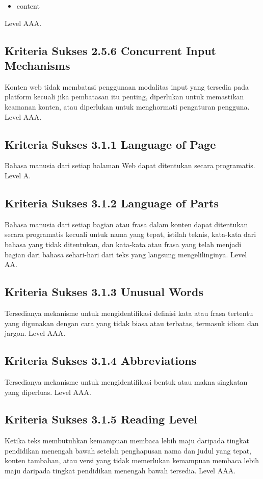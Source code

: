 \begin{itemize}
	\item content
\end{itemize}

Level AAA.

\subsection{Kriteria Sukses 2.5.6 Concurrent Input Mechanisms}
\label{sec:kriteria_2.5.6}
Konten web tidak membatasi penggunaan modalitas input yang tersedia pada platform kecuali jika pembatasan itu penting, diperlukan untuk memastikan keamanan konten, atau diperlukan untuk menghormati pengaturan pengguna.
Level AAA.

\subsection{Kriteria Sukses 3.1.1 Language of Page}
\label{sec:kriteria_3.1.1}
Bahasa manusia dari setiap halaman Web dapat ditentukan secara programatis.
Level A.

\subsection{Kriteria Sukses 3.1.2 Language of Parts}
\label{sec:kriteria_3.1.2}
Bahasa manusia dari setiap bagian atau frasa dalam konten dapat ditentukan secara programatis kecuali untuk nama yang tepat, istilah teknis, kata-kata dari bahasa yang tidak ditentukan, dan kata-kata atau frasa yang telah menjadi bagian dari bahasa sehari-hari dari teks yang langsung mengelilinginya.
Level AA.

\subsection{Kriteria Sukses 3.1.3 Unusual Words}
\label{sec:kriteria_3.1.3}
Tersedianya mekanisme untuk mengidentifikasi definisi kata atau frasa tertentu yang digunakan dengan cara yang tidak biasa atau terbatas, termasuk idiom dan jargon.
Level AAA.

\subsection{Kriteria Sukses 3.1.4 Abbreviations}
\label{sec:kriteria_3.1.4}
Tersedianya mekanisme untuk mengidentifikasi bentuk atau makna singkatan yang diperluas.
Level AAA.

\subsection{Kriteria Sukses 3.1.5 Reading Level}
\label{sec:kriteria_3.1.5}
Ketika teks membutuhkan kemampuan membaca lebih maju daripada tingkat pendidikan menengah bawah setelah penghapusan nama dan judul yang tepat, konten tambahan, atau versi yang tidak memerlukan kemampuan membaca lebih maju daripada tingkat pendidikan menengah bawah tersedia.
Level AAA.

